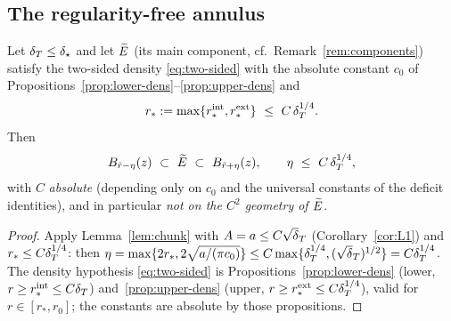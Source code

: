 \subsection{The regularity-free annulus}

\begin{theorem}\label{thm:dens-annulus}
Let $\delta_T\le\delta_\star$ and let $\widetilde E$ \textup{(}its main component, cf.\
Remark~\ref{rem:components}\textup{)} satisfy the two-sided density
\eqref{eq:two-sided} with the absolute constant $c_0$ of
Propositions~\ref{prop:lower-dens}--\ref{prop:upper-dens} and
\[
   r_*:=\max\{r_*^{\mathrm{int}},r_*^{\mathrm{ext}}\}
   \ \le\ C\,\delta_T^{1/4}.
\]
Then
\begin{equation}\label{eq:final-annulus}
   B_{\hat r-\eta}(z)\ \subset\ \widetilde E\ \subset\ B_{\hat r+\eta}(z),
   \qquad
   \eta\ \le\ C\,\delta_T^{1/4},
\end{equation}
with $C$ \emph{absolute} \textup{(}depending only on $c_0$ and the
universal constants of the deficit identities\textup{)}, and in particular
\emph{not on the $C^2$ geometry of $\widetilde E$}.
\end{theorem}

\begin{proof}
Apply Lemma~\ref{lem:chunk} with $A=a\le C\sqrt\dT$ (Corollary~\ref{cor:L1})
and $r_*\le C\delta_T^{1/4}$: then
$\eta=\max\{2r_*,2\sqrt{a/(\pi c_0)}\}\le C\max\{\dT^{1/4},(\sqrt\dT)^{1/2}\}
=C\dT^{1/4}$. The density hypothesis \eqref{eq:two-sided} is
Propositions~\ref{prop:lower-dens} (lower, $r\ge r_*^{\mathrm{int}}\le
C\delta_T$) and~\ref{prop:upper-dens} (upper, $r\ge r_*^{\mathrm{ext}}\le
C\delta_T^{1/4}$), valid for $r\in[r_*,r_0]$; the constants are absolute by those
propositions.
\end{proof}

